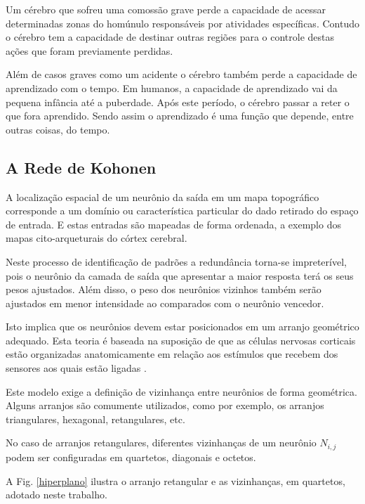 Um cérebro que sofreu uma comossão grave perde a capacidade de acessar
determinadas zonas do homúnulo responsáveis por atividades específicas. Contudo
o cérebro tem a capacidade de destinar outras regiões para o controle destas
ações que foram previamente perdidas.

Além de casos graves como um acidente o cérebro também perde a capacidade de
aprendizado com o tempo. Em humanos, a capacidade de aprendizado vai da pequena
infância até a puberdade. Após este período, o cérebro passar a reter o que fora
aprendido. Sendo assim o aprendizado é uma função que depende, entre outras
coisas, do tempo.

\subsection{A Rede de Kohonen}

A localização espacial de um neurônio da saída em um mapa topográfico
corresponde a um domínio ou característica particular do dado retirado do espaço
de entrada. E estas entradas são mapeadas de forma ordenada, a exemplo dos mapas
cito-arqueturais do córtex cerebral.

Neste processo de identificação de padrões a redundância torna-se impreterível,
pois o neurônio da camada de saída que apresentar a maior resposta terá os seus
pesos ajustados. Além disso, o peso dos neurônios vizinhos também serão
ajustados em menor intensidade ao comparados com o neurônio vencedor.

Isto implica que os neurônios devem estar posicionados em um arranjo geométrico
adequado. Esta teoria é baseada na suposição de que as células nervosas
corticais estão organizadas anatomicamente em relação aos estímulos que recebem
dos sensores aos quais estão ligadas \citep{Artero2009}.

Este modelo exige a definição de vizinhança entre neurônios de forma geométrica.
Alguns arranjos são comumente utilizados, como por exemplo, os arranjos
triangulares, hexagonal, retangulares, etc.

No caso de arranjos retangulares, diferentes vizinhanças de um neurônio
$N_{i,j}$ podem ser configuradas em quartetos, diagonais e octetos. 

A Fig. \ref{hiperplano} ilustra o arranjo retangular e as vizinhanças, em quartetos, adotado neste trabalho. 

